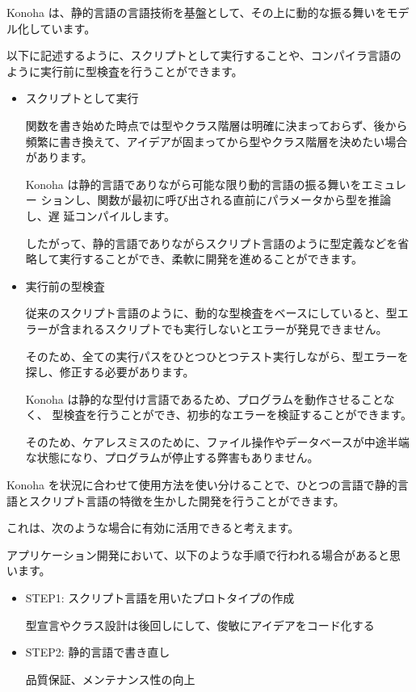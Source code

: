 \documentclass[mingoth,a4paper]{jsarticle}
\begin{document}
Konoha は、静的言語の言語技術を基盤として、その上に動的な振る舞いをモデ
ル化しています。

以下に記述するように、スクリプトとして実行することや、コンパイラ言語の
ように実行前に型検査を行うことができます。

\begin{itemize}
\item スクリプトとして実行

関数を書き始めた時点では型やクラス階層は明確に決まっておらず、後から
頻繁に書き換えて、アイデアが固まってから型やクラス階層を決めたい場合
があります。

Konoha は静的言語でありながら可能な限り動的言語の振る舞いをエミュレー
ションし、関数が最初に呼び出される直前にパラメータから型を推論し、遅
延コンパイルします。

したがって、静的言語でありながらスクリプト言語のように型定義などを省
略して実行することができ、柔軟に開発を進めることができます。

\item 実行前の型検査

従来のスクリプト言語のように、動的な型検査をベースにしていると、型エ
ラーが含まれるスクリプトでも実行しないとエラーが発見できません。

そのため、全ての実行パスをひとつひとつテスト実行しながら、型エラーを
探し、修正する必要があります。

Konoha は静的な型付け言語であるため、プログラムを動作させることなく、
型検査を行うことができ、初歩的なエラーを検証することができます。

そのため、ケアレスミスのために、ファイル操作やデータベースが中途半端
な状態になり、プログラムが停止する弊害もありません。

\end{itemize}

Konoha を状況に合わせて使用方法を使い分けることで、ひとつの言語で静的言
語とスクリプト言語の特徴を生かした開発を行うことができます。

これは、次のような場合に有効に活用できると考えます。

アプリケーション開発において、以下のような手順で行われる場合があると思
います。

\begin{itemize}
\item STEP1: スクリプト言語を用いたプロトタイプの作成

型宣言やクラス設計は後回しにして、俊敏にアイデアをコード化する

\item STEP2: 静的言語で書き直し

品質保証、メンテナンス性の向上
\end{itemize}
\end{document}
